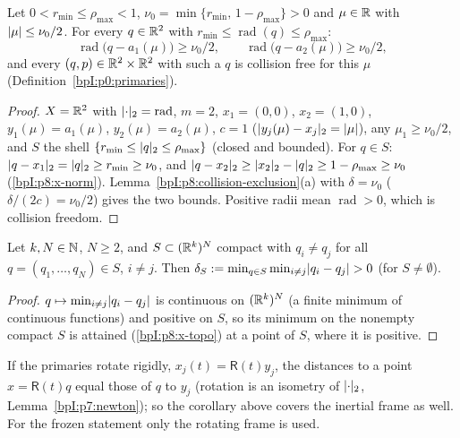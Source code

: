 \begin{corollary}\label{bpI:p8:shell-exclusion}
Let $0<r_{\min}\le\rho_{\max}<1$, $\nu_0=\min\{r_{\min},\,1-\rho_{\max}\}>0$ and $\mu\in\mathbb{R}$ with $\lvert \mu\rvert\le\nu_0/2$. For every $q\in\mathbb{R}^2$ with $r_{\min}\le\operatorname{rad}(q)\le\rho_{\max}$:
\[
\operatorname{rad}\bigl(q-a_1(\mu)\bigr)\ge\nu_0/2,\qquad\operatorname{rad}\bigl(q-a_2(\mu)\bigr)\ge\nu_0/2,
\]
and every $(q,p)\in\mathbb{R}^2\times\mathbb{R}^2$ with such a $q$ is collision free for this $\mu$ (Definition~\ref{bpI:p0:primaries}).
\end{corollary}
\begin{proof}
\label{stepI:p8:se-inst} $X=\mathbb{R}^2$ with $\lvert \cdot\rvert_2=\operatorname{rad}$, $m=2$, $x_1=(0,0)$, $x_2=(1,0)$, $y_1(\mu)=a_1(\mu)$, $y_2(\mu)=a_2(\mu)$, $c=1$ ($\lvert y_j(\mu)-x_j\rvert_2=\lvert \mu\rvert$), any $\mu_1\ge\nu_0/2$, and $S$ the shell $\{r_{\min}\le\lvert q\rvert_2\le\rho_{\max}\}$ (closed and bounded). For $q\in S$: $\lvert q-x_1\rvert_2=\lvert q\rvert_2\ge r_{\min}\ge\nu_0$, and $\lvert q-x_2\rvert_2\ge\lvert x_2\rvert_2-\lvert q\rvert_2\ge1-\rho_{\max}\ge\nu_0$ (\ref{bpI:p8:x-norm}). Lemma~\ref{bpI:p8:collision-exclusion}(a) with $\delta=\nu_0$ ($\delta/(2c)=\nu_0/2$) gives the two bounds. Positive radii mean $\operatorname{rad}>0$, which is collision freedom.
\end{proof}

\begin{corollary}\label{bpI:p8:min-distance}
Let $k,N\in\mathbb{N}$, $N\ge2$, and $S\subset(\mathbb{R}^k)^N$ compact with $q_i\ne q_j$ for all $q=(q_1,\dots,q_N)\in S$, $i\ne j$. Then $\delta_S:=\min_{q\in S}\min_{i\neq j}\lvert q_i-q_j\rvert>0$ (for $S\ne\emptyset$).
\end{corollary}
\begin{proof}
\label{stepI:p8:md-min} $q\mapsto\min_{i\ne j}\lvert q_i-q_j\rvert$ is continuous on $(\mathbb{R}^k)^N$ (a finite minimum of continuous functions) and positive on $S$, so its minimum on the nonempty compact $S$ is attained (\ref{bpI:p8:x-topo}) at a point of $S$, where it is positive.
\end{proof}

\begin{remark}\label{bpI:p8:rotating}
If the primaries rotate rigidly, $x_j(t)=\mathsf R(t)y_j$, the distances to a point $x=\mathsf R(t)q$ equal those of $q$ to $y_j$ (rotation is an isometry of $\lvert \cdot\rvert_2$, Lemma~\ref{bpI:p7:newton}); so the corollary above covers the inertial frame as well. For the frozen statement only the rotating frame is used.
\end{remark}

